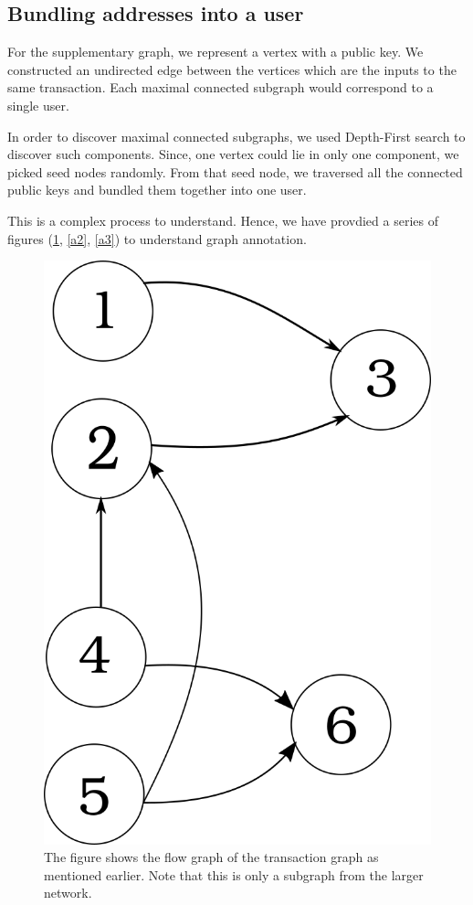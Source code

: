 \documentclass[runningheads,a4paper]{llncs}[2017/09/04]
\begin{document}
\subsection{Bundling addresses into a user}

For the supplementary graph, we represent a vertex with a public key.
We constructed an undirected edge between the vertices which are the inputs to the same transaction.
Each maximal connected subgraph would correspond to a single user.

In order to discover maximal connected subgraphs, we used Depth-First search to discover such components. 
Since, one vertex could lie in only one component, we picked seed nodes randomly. From that seed node, we traversed all the connected public keys and bundled them together into one user.

This is a complex process to understand. Hence, we have provdied a series of figures (\ref{a1}, \ref{a2}, \ref{a3}) to understand graph annotation.

\begin{figure}[!htb]
	\centering 
	\includegraphics[width=0.4\columnwidth]{bitmap} 
	\caption{The figure shows the flow graph of the transaction graph as mentioned earlier. Note that this is only a subgraph from the larger network.} %
	\label{a1}
\end{figure}
\end{document}
